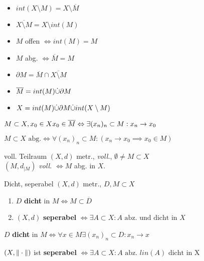 \begin{itemize}
  \item $int(X\setminus M) = X \setminus \overline{M}$
  \item $\overline{X \setminus M} = X \setminus int(M)$
  \item $M$ offen $\Leftrightarrow int(M) = M$
  \item $M$ abg. $\Leftrightarrow \overline{M} = M$
  \item $\partial M = \overline{M} \cap \overline{X\setminus M}$
  \item $\overline{M} = int(M) \dot{\cup} \partial M$
  \item $X = int(M) \dot{\cup} \partial M \dot{\cup} int(X \setminus M)$
\end{itemize}
\heel

\begin{lemma}
  $M \subset X, x_0 \in X\\ x_0 \in \overline{M} \Leftrightarrow
  \exists (x_n)_n \subset M: x_n \to x_0$
\end{lemma}

\begin{korrolar}
  $M \subset X \text{ abg.} \Leftrightarrow \forall (x_n)_n \subset M:
  {(x_n \to x_0 \implies x_0 \in M)}$
\end{korrolar}

\begin{satz}{voll. Teilraum}
  $(X,d)$ metr., \textit{voll.}, $\emptyset \neq M \subset X$\\
  $(M,d_{|M})$ \textit{voll.} $\Leftrightarrow M$ abg. in $X$.
\end{satz}

\dheel

\begin{definition}{Dicht, seperabel}
  $(X,d)$ metr., $D,M \subset X$
  \begin{enumerate}[label = (\arabic*)]
    \item $D$ \textbf{dicht} in $M \Leftrightarrow M \subset \overline{D}$
    \item $(X,d)$ \textbf{seperabel} $\Leftrightarrow \exists A \subset X:
    A \text{ abz. und dicht in }X$
  \end{enumerate}
\end{definition}

$D$ \textbf{dicht} in $M \Leftrightarrow \forall x
\in M \exists (x_n)_n \subset D: x_n \to x$
\heel

\begin{lemma}
  $(X, \|\cdot\|)$ ist \textbf{seperabel} $\Leftrightarrow
  \exists A \subset X: A \text{ abz. } lin(A) \text{ dicht in X}$
\end{lemma}



